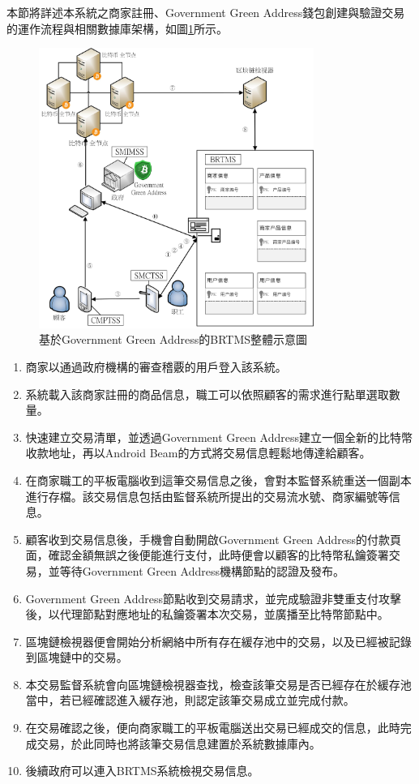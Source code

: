 本節將詳述本系統之商家註冊、Government Green Address錢包創建與驗證交易的運作流程與相關數據庫架構，如圖\ref{gabpcss}所示。

	\begin{figure}[!htbp]
		\centering
		\includegraphics[width = 0.8\textwidth]{gabpcss.jpg}
		\caption{基於Government Green Address的BRTMS整體示意圖}\label{gabpcss}
	\end{figure}

	\begin{enumerate}
		\item 商家以通過政府機構的審查稽覈的用戶登入該系統。
		\item 系統載入該商家註冊的商品信息，職工可以依照顧客的需求進行點單選取數量。
		\item 快速建立交易清單，並透過Government Green Address建立一個全新的比特幣收款地址，再以Android Beam的方式將交易信息輕鬆地傳達給顧客。
		\item 在商家職工的平板電腦收到這筆交易信息之後，會對本監督系統重送一個副本進行存檔。該交易信息包括由監督系統所提出的交易流水號、商家編號等信息。
		\item 顧客收到交易信息後，手機會自動開啟Government Green Address的付款頁面，確認金額無誤之後便能進行支付，此時便會以顧客的比特幣私鑰簽署交易，並等待Government Green Address機構節點的認證及發布。
		\item Government Green Address節點收到交易請求，並完成驗證非雙重支付攻擊後，以代理節點對應地址的私鑰簽署本次交易，並廣播至比特幣節點中。
		\item 區塊鏈檢視器便會開始分析網絡中所有存在緩存池中的交易，以及已經被記錄到區塊鏈中的交易。
		\item 本交易監督系統會向區塊鏈檢視器查找，檢查該筆交易是否已經存在於緩存池當中，若已經確認進入緩存池，則認定該筆交易成立並完成付款。
		\item 在交易確認之後，便向商家職工的平板電腦送出交易已經成交的信息，此時完成交易，於此同時也將該筆交易信息建置於系統數據庫內。
		\item 後續政府可以連入BRTMS系統檢視交易信息。
	\end{enumerate}